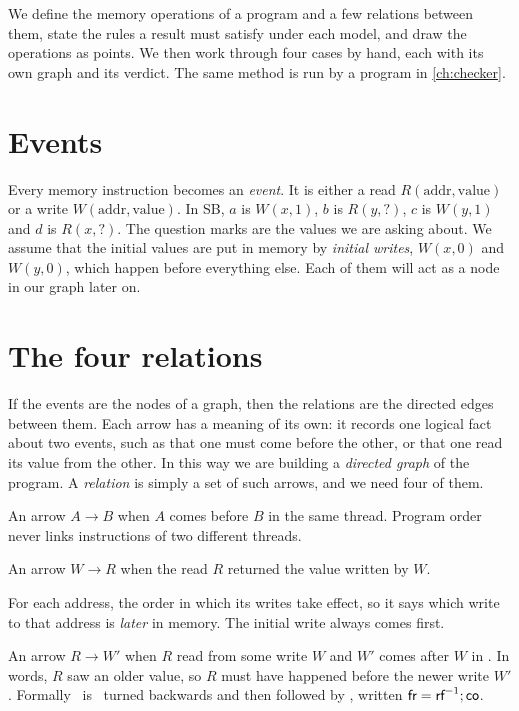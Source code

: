 \noindent We define the memory operations of a program and a few relations between them, state the rules a result must satisfy under each model, and draw the operations as points. We then work through four cases by hand, each with its own graph and its verdict. The same method is run by a program in \cref{ch:checker}.

\section{Events}
\label{sec:events}

Every memory instruction becomes an \emph{event}. It is either a read $R(\text{addr}, \text{value})$ or a write $W(\text{addr}, \text{value})$. In SB, $a$ is $W(x,1)$, $b$ is $R(y,?)$, $c$ is $W(y,1)$ and $d$ is $R(x,?)$. The question marks are the values we are asking about. We assume that the initial values are put in memory by \emph{initial writes}, $W(x,0)$ and $W(y,0)$, which happen before everything else. Each of them will act as a node in our graph later on.

\section{The four relations}
\label{sec:relations}

If the events are the nodes of a graph, then the relations are the directed edges between them. Each arrow has a meaning of its own: it records one logical fact about two events, such as that one must come before the other, or that one read its value from the other. In this way we are building a \emph{directed graph} of the program. A \emph{relation} is simply a set of such arrows, and we need four of them.

\begin{description}[leftmargin=0.9cm, style=nextline]
\item[\po\ \normalfont(program order)] An arrow $A \to B$ when $A$ comes before $B$ in the same thread. Program order never links instructions of two different threads.
\item[\rf\ \normalfont(reads-from)] An arrow $W \to R$ when the read $R$ returned the value written by $W$.
\item[\co\ \normalfont(coherence order)] For each address, the order in which its writes take effect, so it says which write to that address is \emph{later} in memory. The initial write always comes first.
\item[\fr\ \normalfont(from-read)] An arrow $R \to W'$ when $R$ read from some write $W$ and $W'$ comes after $W$ in \co. In words, $R$ saw an older value, so $R$ must have happened before the newer write $W'$. Formally \fr\ is \rf\ turned backwards and then followed by \co, written $\textsf{fr} = \textsf{rf}^{-1};\textsf{co}$.
\end{description}

